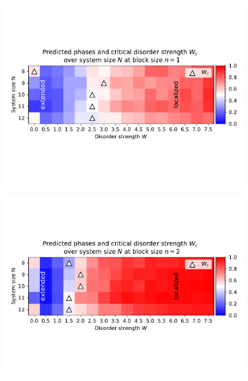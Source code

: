 \documentclass[reprint,amsmath,amssymb,aps,prb]{revtex4-2}
\begin{document}
\onecolumngrid
\begin{center}
	\begin{figure}[H]
		\centering	
		\begin{subfigure}[c]{0.4\textwidth}
			\includegraphics[width=\textwidth]{../results/Wc/n1_Wc_N_dependency.pdf}
		\end{subfigure}
		\begin{subfigure}[c]{0.4\textwidth}
			\includegraphics[width=\textwidth]{../results/Wc/n2_Wc_N_dependency.pdf}
		\end{subfigure}
		\begin{subfigure}[c]{0.4\textwidth}

\end{subfigure}
\end{figure}
\end{center}
\end{document}
